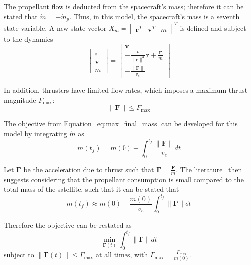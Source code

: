 The propellant flow is deducted from the spacecraft's mass; therefore it can be stated that \(\dot{m} = - \dot{m}_p\). Thus, in this model, the spacecraft's mass is a seventh state variable. A new state vector \(X_m = \begin{bmatrix}
    \mathbf{r}^T & \mathbf{v}^T & m 
\end{bmatrix}^T\) is defined and subject to the dynamics
\begin{equation}
    \begin{bmatrix}
        \dot{\mathbf{r}} \\ \dot{\mathbf{v}} \\ \dot{m}
    \end{bmatrix} = \begin{bmatrix}
        \mathbf{v} \\ -\frac{\mu}{\lVert \mathbf{r} \rVert^3}\mathbf{r} + \frac{\mathbf{F}}{m} \\ -\frac{\lVert \mathbf{F} \rVert}{v_e}
    \end{bmatrix}
\end{equation}

In addition, thrusters have limited flow rates, which imposes a maximum thrust magnitude \(F_{\max}\):
\begin{equation}
    \lVert \mathbf{F} \rVert \leq F_{\max}
\end{equation}

The objective from Equation~\eqref{eq:max_final_mass} can be developed for this model by integrating \(\dot{m}\) as
\begin{equation}
    m(t_f) = m(0) - \int_0^{t_f} \frac{\lVert \mathbf{F} \rVert}{v_e} dt
\end{equation}

Let \(\mathbf{\Gamma}\) be the acceleration due to thrust such that \(\mathbf{\Gamma} = \frac{\mathbf{F}}{m}\). The literature~\cite{Conway_2010} then suggests considering that the propellant consumption is small compared to the total mass of the satellite, such that it can be stated that
\begin{equation}
    m(t_f) \approx m(0) - \frac{m(0)}{v_e}\int_0^{t_f} \lVert \mathbf{\Gamma} \rVert dt
\end{equation}

Therefore the objective can be restated as
\begin{equation}\label{eq:obj_continuous_thrust}
    \min_{\mathbf{\Gamma}(t)} \int_0^{t_f} \lVert \mathbf{\Gamma} \rVert dt
\end{equation}
subject to \(\lVert \mathbf{\Gamma}(t) \rVert \leq \Gamma_{\max}\) at all times, with \(\Gamma_{\max} = \frac{F_{\max}}{m(0)}\).

